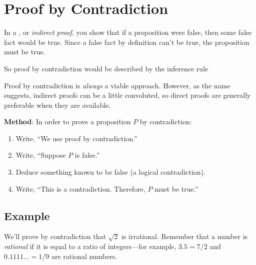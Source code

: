 \begin{problems}

\classproblems
{}

\homeworkproblems
{}
\end{problems}

\section{Proof by Contradiction}\label{contradiction_sec}

In a , or \emph{indirect proof},%
you show that if a proposition were false, then some false fact would be true.
Since a false fact by definition can't be true, the proposition must
be true.

\begin{editingnotes}
So proof by contradiction would be described by the inference rule
\begin{rul*}
\end{rul*}

\end{editingnotes}

Proof by contradiction is \emph{always} a viable approach.  However,
as the name suggests, indirect proofs can be a little convoluted, so
direct proofs are generally preferable when they are available.

\textbf{Method}: In order to prove a proposition $P$ by contradiction:

\begin{enumerate}

\item Write, ``We use proof by contradiction.''

\item Write, ``Suppose $P$ is false.''

\item Deduce something known to be false (a logical contradiction).

\item Write, ``This is a contradiction.  Therefore, $P$ must be
true.''

\end{enumerate}

\subsection*{Example}
We'll prove by contradiction that $\sqrt{2}$ is irrational. 
Remember that a number is \emph{rational} if it is equal to a ratio
of integers---for example, $3.5 = 7/2$ and $0.1111\dots = 1/9$ are
rational numbers.


